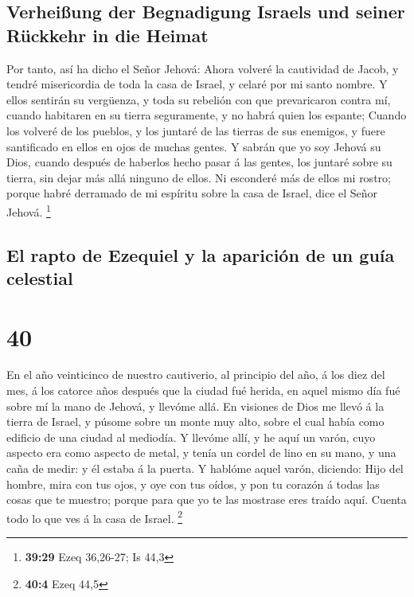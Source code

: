 \hypertarget{verheiuxdfung-der-begnadigung-israels-und-seiner-ruxfcckkehr-in-die-heimat}{%
\subsection{Verheißung der Begnadigung Israels und seiner Rückkehr in
die
Heimat}\label{verheiuxdfung-der-begnadigung-israels-und-seiner-ruxfcckkehr-in-die-heimat}}

 Por tanto, así ha dicho el Señor Jehová: Ahora volveré
la cautividad de Jacob, y tendré misericordia de toda la casa de Israel,
y celaré por mi santo nombre.  Y ellos sentirán su
vergüenza, y toda su rebelión con que prevaricaron contra mí, cuando
habitaren en su tierra seguramente, y no habrá quien los espante;
 Cuando los volveré de los pueblos, y los juntaré de las
tierras de sus enemigos, y fuere santificado en ellos en ojos de muchas
gentes.  Y sabrán que yo soy Jehová su Dios, cuando
después de haberlos hecho pasar á las gentes, los juntaré sobre su
tierra, sin dejar más allá ninguno de ellos.  Ni
esconderé más de ellos mi rostro; porque habré derramado de mi espíritu
sobre la casa de Israel, dice el Señor Jehová. \footnote{\textbf{39:29}
  Ezeq 36,26-27; Is 44,3}

\hypertarget{el-rapto-de-ezequiel-y-la-apariciuxf3n-de-un-guuxeda-celestial}{%
\subsection{El rapto de Ezequiel y la aparición de un guía
celestial}\label{el-rapto-de-ezequiel-y-la-apariciuxf3n-de-un-guuxeda-celestial}}

\hypertarget{section-39}{%
\section{40}\label{section-39}}

 En el año veinticinco de nuestro cautiverio, al principio
del año, á los diez del mes, á los catorce años después que la ciudad
fué herida, en aquel mismo día fué sobre mí la mano de Jehová, y llevóme
allá.  En visiones de Dios me llevó á la tierra de Israel,
y púsome sobre un monte muy alto, sobre el cual había como edificio de
una ciudad al mediodía.  Y llevóme allí, y he aquí un
varón, cuyo aspecto era como aspecto de metal, y tenía un cordel de lino
en su mano, y una caña de medir: y él estaba á la puerta. 
Y hablóme aquel varón, diciendo: Hijo del hombre, mira con tus ojos, y
oye con tus oídos, y pon tu corazón á todas las cosas que te muestro;
porque para que yo te las mostrase eres traído aquí. Cuenta todo lo que
ves á la casa de Israel. \footnote{\textbf{40:4} Ezeq 44,5}

